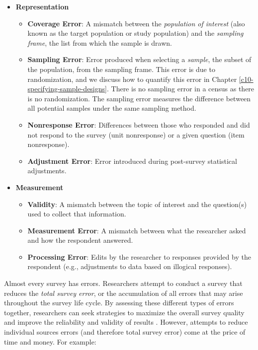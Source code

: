 \documentclass[
]{krantz}
\providecommand{\tightlist}{%
  \setlength{\itemsep}{0pt}\setlength{\parskip}{0pt}}
\begin{document}
\begin{itemize}
\tightlist
\item
  \textbf{Representation}

  \begin{itemize}
  \tightlist
  \item
    \textbf{Coverage Error}: A mismatch between the \emph{population of interest} (also known as the target population or study population) and the \emph{sampling frame}, the list from which the sample is drawn.
  \item
    \textbf{Sampling Error}: Error produced when selecting a \emph{sample}, the subset of the population, from the sampling frame. This error is due to randomization, and we discuss how to quantify this error in Chapter \ref{c10-specifying-sample-designs}. There is no sampling error in a census as there is no randomization. The sampling error measures the difference between all potential samples under the same sampling method.
  \item
    \textbf{Nonresponse Error}: Differences between those who responded and did not respond to the survey (unit nonresponse) or a given question (item nonresponse).
  \item
    \textbf{Adjustment Error}: Error introduced during post-survey statistical adjustments.
  \end{itemize}
\item
  \textbf{Measurement}

  \begin{itemize}
  \tightlist
  \item
    \textbf{Validity}: A mismatch between the topic of interest and the question(s) used to collect that information.
  \item
    \textbf{Measurement Error}: A mismatch between what the researcher asked and how the respondent answered.
  \item
    \textbf{Processing Error}: Edits by the researcher to responses provided by the respondent (e.g., adjustments to data based on illogical responses).
  \end{itemize}
\end{itemize}

Almost every survey has errors. Researchers attempt to conduct a survey that reduces the \emph{total survey error}, or the accumulation of all errors that may arise throughout the survey life cycle. By assessing these different types of errors together, researchers can seek strategies to maximize the overall survey quality and improve the reliability and validity of results \citep{tse-doc}. However, attempts to reduce individual sources errors (and therefore total survey error) come at the price of time and money. For example:
\end{document}
